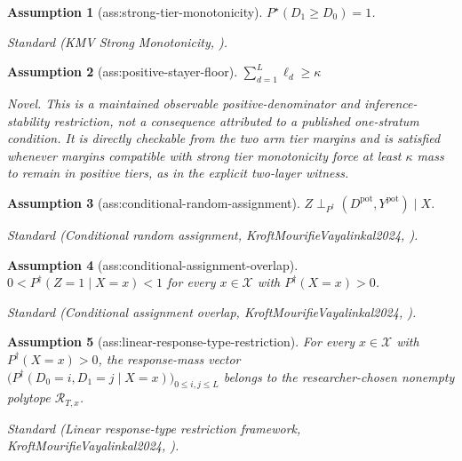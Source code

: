 \documentclass{article}
\newtheorem{assumption}{Assumption}
\begin{document}
\begin{assumption}[ass:strong-tier-monotonicity]\label{ass:strong-tier-monotonicity}
\(P^{\star}(D_1\ge D_0)=1\).
\par\smallskip\noindent\emph{Standard} (KMV Strong Monotonicity, \cite{KroftMourifieVayalinkal2024}).
\end{assumption}

\begin{assumption}[ass:positive-stayer-floor]\label{ass:positive-stayer-floor}
\(\sum_{d=1}^{L}\ell_d\ge\kappa\)
\par\smallskip\noindent\emph{Novel.} This is a maintained observable positive-denominator and inference-stability restriction, not a consequence attributed to a published one-stratum condition. It is directly checkable from the two arm tier margins and is satisfied whenever margins compatible with strong tier monotonicity force at least \(\kappa\) mass to remain in positive tiers, as in the explicit two-layer witness.
\end{assumption}

\begin{assumption}[ass:conditional-random-assignment]\label{ass:conditional-random-assignment}
\(Z\perp_{P^{\dagger}}(D^{\mathrm{pot}},Y^{\mathrm{pot}})\mid X\).
\par\smallskip\noindent\emph{Standard} (Conditional random assignment, KroftMourifieVayalinkal2024, \cite{KroftMourifieVayalinkal2024}).
\end{assumption}

\begin{assumption}[ass:conditional-assignment-overlap]\label{ass:conditional-assignment-overlap}
\(0<P^{\dagger}(Z=1\mid X=x)<1\) for every \(x\in\mathcal X\) with \(P^{\dagger}(X=x)>0\).
\par\smallskip\noindent\emph{Standard} (Conditional assignment overlap, KroftMourifieVayalinkal2024, \cite{KroftMourifieVayalinkal2024}).
\end{assumption}

\begin{assumption}[ass:linear-response-type-restriction]\label{ass:linear-response-type-restriction}
For every \(x\in\mathcal X\) with \(P^{\dagger}(X=x)>0\), the response-mass vector \(\bigl(P^{\dagger}(D_0=i,D_1=j\mid X=x)\bigr)_{0\le i,j\le L}\) belongs to the researcher-chosen nonempty polytope \(\mathcal R_{T,x}\).
\par\smallskip\noindent\emph{Standard} (Linear response-type restriction framework, KroftMourifieVayalinkal2024, \cite{KroftMourifieVayalinkal2024}).
\end{assumption}
\end{document}

